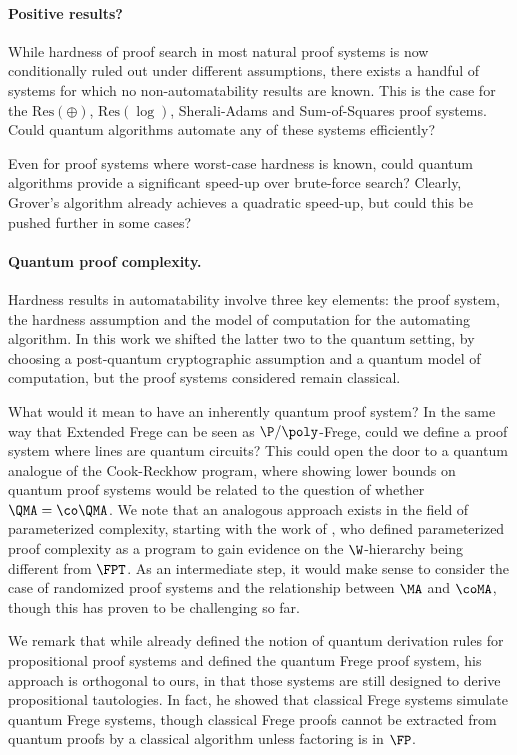 \documentclass[11pt]{article}
\theoremstyle{definition}
\theoremstyle{plain}
\theoremstyle{remark}
\begin{document}
\paragraph{Positive results?}
While hardness of proof search in most natural proof systems is now conditionally ruled out under different assumptions, there exists a handful of systems for which no non-automatability results  are known. This is the case for the $\text{Res}(\oplus)$, $\text{Res}(\log)$, Sherali-Adams and Sum-of-Squares proof systems. Could quantum algorithms automate any of these systems efficiently?

Even for proof systems where worst-case hardness is known, could quantum algorithms provide a significant speed-up over brute-force search? Clearly, Grover's algorithm already achieves a quadratic speed-up, but could this be pushed further in some cases?

\paragraph{Quantum proof complexity.}
Hardness results in automatability involve three key elements: the proof system, the hardness assumption and the model of computation for the automating algorithm. In this work we shifted the latter two to the quantum setting, by choosing a post-quantum cryptographic assumption and a quantum model of computation, but the proof systems considered remain classical.

What would it mean to have an inherently quantum proof system? In the same way that Extended Frege can be seen as $\P/\poly$-Frege, could we define a proof system where lines are quantum circuits? This could open the door to a quantum analogue of the Cook-Reckhow program, where showing lower bounds on quantum proof systems would be related to the question of whether $\QMA = \co\QMA$. We note that an analogous approach exists in the field of parameterized complexity, starting with the work of \citeauthor{dantchev2011parameterized} \cite{dantchev2011parameterized}, who defined parameterized proof complexity as a program to gain evidence on the $\W$-hierarchy being different from $\FPT$. As an intermediate step, it would make sense to consider the case of randomized proof systems and the relationship between $\MA$ and $\coMA$, though this has proven to be challenging so far.

We remark that while \citeauthor{Pud09} \cite{Pud09} already defined the notion of quantum derivation rules for propositional proof systems and defined the quantum Frege proof system, his approach is orthogonal to ours, in that those systems are still designed to derive propositional tautologies. In fact, he showed that classical Frege systems simulate quantum Frege systems, though classical Frege proofs cannot be extracted from quantum proofs by a classical algorithm unless factoring is in $\FP$.
\end{document}
